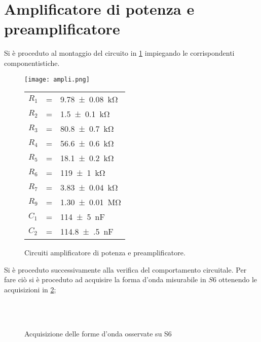 \section{Amplificatore di potenza e preamplificatore}
	Si è proceduto al montaggio del circuito in \figurename{ \ref{fig:ampli}}
	impiegando le corrispondenti componentistiche.
	\begin{figure}[htb]
		\begin{minipage}{0.75\textwidth}
		\centering
		\texttt{[image: ampli.png]}
		\caption{Circuiti amplificatore di potenza e preamplificatore.}
		\label{fig:ampli}
		\end{minipage}
			\begin{minipage}{0.19\textwidth}
			\begin{tabular}{l@{ }c@{ }l}
				$R_{1}$& = &\SI{9.78\pm 0.08}{\kilo\ohm}\\
				$R_{2}$& = &\SI{1.5\pm0.1}{\kilo\ohm}\\
				$R_{3}$& = &\SI{80.8\pm0.7}{\kilo\ohm}\\
				$R_{4}$& = &\SI{56.6\pm0.6}{\kilo\ohm}\\
				$R_{5}$& = &\SI{18.1\pm0.2}{\kilo\ohm}\\
				$R_{6}$& = &\SI{119(1)}{\kilo\ohm}\\
				$R_{7}$& = &\SI{3.83\pm0.04}{\kilo\ohm}\\
				$R_{9}$& = &\SI{1.30\pm0.01}{\mega\ohm}\\
			
				
				
				$C_1$& = &\SI{114(5)}{\nano\farad}\\
				$C_2$& = &\SI{114.8(5)}{\nano\farad}
		\end{tabular}
		\end{minipage}
	\end{figure}
	Si è proceduto successivamente alla verifica del comportamento circuitale.
	Per fare ciò si è proceduto ad acquisire la forma d'onda misurabile in $S6$
	ottenendo le acquisizioni in \figurename{ \ref{fig:S6}};
	\begin{figure}[h]
		\centering
		\qquad
		\\
		\qquad
		\\
		\caption{Acquisizione delle forme d'onda osservate su S6}
		\label{fig:S6}
	\end{figure}
